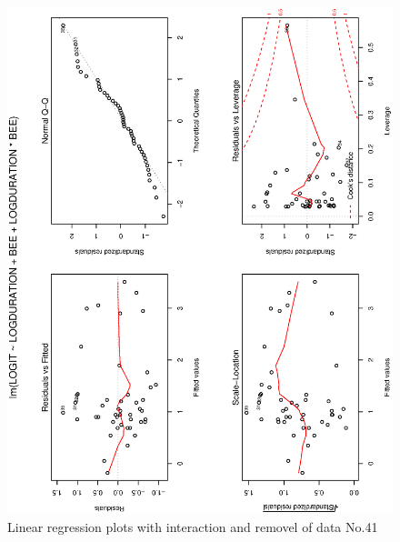 \documentclass[a4paper,10pt]{article}
\begin{document}
\begin{figure}
\includegraphics[angle=-90, width=1\textwidth]{figures/math650_hw7_fig5.eps}
\caption{Linear regression plots with interaction and removel of data No.41}\label{f5}
\end{figure}
\end{document}

